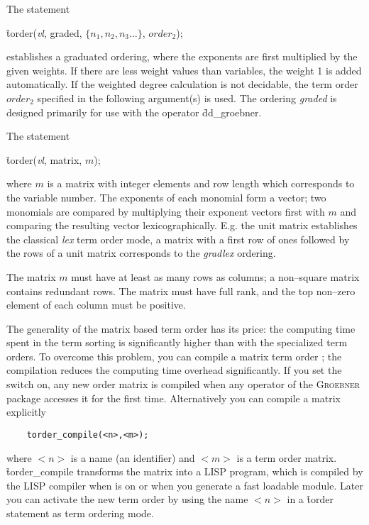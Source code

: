  
The statement
\begin{center}
\f{torder}(\emph{vl}, graded, $\{n_1,n_2,n_3 \ldots\}$, $order_2$);
\end{center}
establishes a graduated ordering, where the exponents are first
multiplied by the given weights. If there are less weight values than
variables, the weight 1 is added automatically. If the weighted
degree calculation is not decidable, the term order $order_2$ specified
in the following argument(s) is used.  The ordering \emph{graded} is designed
primarily for use with the operator \f{dd\_groebner}.

 
The statement
\begin{center}
\f{torder}(\emph{vl}, matrix, $m$);
\end{center}
where $m$ is a matrix with integer elements and row length which
corresponds to the variable number. The exponents of each monomial
form a vector; two monomials are compared by multiplying their
exponent vectors first with $m$ and comparing the resulting vector
lexicographically. E.g. the unit matrix establishes the classical
\emph{lex} term order mode, a matrix with a first row of ones followed
by the rows of a unit matrix corresponds to the \emph{gradlex} ordering.

The matrix $m$ must have at least as many rows as columns; a non--square
matrix contains redundant rows. The matrix must have full rank, and
the top non--zero element of each column must be positive.

The generality of the matrix based term order has its price: the
computing time spent in the term sorting is significantly higher
than with the specialized term orders. To overcome this problem,
you can compile a matrix term order ; the
compilation reduces the computing time overhead significantly.
If you set the switch  on,
any new order matrix is compiled
when any operator of the \textsc{Groebner} package accesses it for the
first time. Alternatively you can compile a matrix explicitly
\hypertarget{operator:TORDER_COMPILE}{}
\begin{verbatim}
    torder_compile(<n>,<m>);
\end{verbatim}
where $<n>$ is a name (an identifier) and $<m>$ is a term order matrix.
\f{torder\_compile} transforms the matrix into a LISP program, which
is compiled by the LISP compiler when  is on or when you
generate a fast loadable module. Later you can activate the new term
order by using the name $<n>$ in a \f{torder} statement as term ordering
mode.

